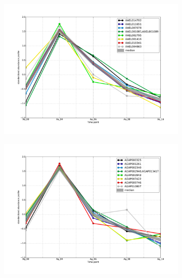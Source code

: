 
\begin{figure}[hp]
% 
\begin{subfigure}[t]{.5\linewidth}
\includegraphics[width=\linewidth]{figures/figs/ecr_and_insects_ptci_20130903/upAt4_gene_profiles_from_cummerbund/Aa_upAt4_cls6_Ag_target_FPKMs_vb_orthos.pdf}
\caption{}
\label{fig:cluster6-Aa}
\end{subfigure}%
%
\begin{subfigure}[t]{.5\linewidth}
\includegraphics[width=\linewidth]{figures/figs/ecr_and_insects_ptci_20130903/upAt4_gene_profiles_from_cummerbund/Ag_upAt4_cls6_Ag_target_FPKMs_vb_orthos.pdf}
\caption{}
\label{fig:cluster6-Ag}
\end{subfigure}
% 
\begin{subfigure}[t]{.5\linewidth}

\end{subfigure}
\end{figure}
